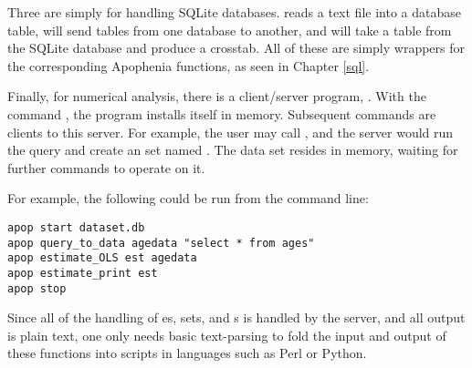 Three are simply for handling SQLite databases.  
 reads a text file into a database table,
 will send tables from one database to
another, and
 will take a table from the SQLite
database and produce a crosstab. All of these are simply wrappers for
the corresponding Apophenia functions, as seen in Chapter \ref{sql}.

Finally, for numerical analysis, there is a client/server program,
.  With the command , the program installs itself in memory.
Subsequent commands are clients to this server. For
example, the user may call , and the server would run the query and create an
 set named . The data set resides in
memory, waiting for further commands to operate on it.

For example, the following could be run from the command line:
\begin{lstlisting}
apop start dataset.db
apop query_to_data agedata "select * from ages"
apop estimate_OLS est agedata 
apop estimate_print est
apop stop
\end{lstlisting}

Since all of the handling of es,
 sets, and s is handled by
the server, and all output is plain text, one only needs
basic text-parsing to fold the input and output of these functions into
scripts in languages such as Perl or Python.  

